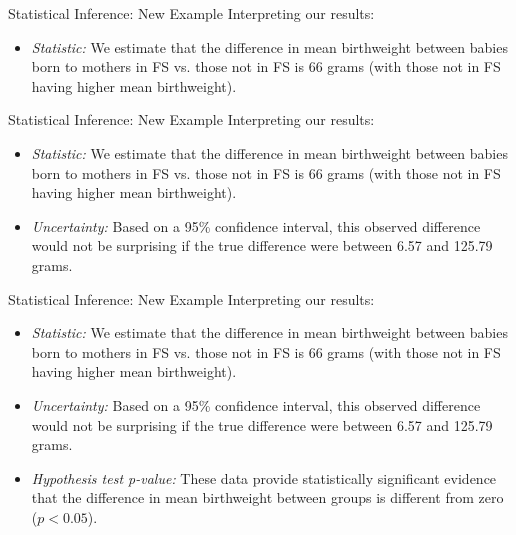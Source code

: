 \documentclass[10pt,t]{beamer}
\begin{document}
\begin{frame}{Statistical Inference: New Example}
Interpreting our results:

\vspace{0.3cm}

\begin{itemize}
	\item \textit{Statistic:} We estimate that the difference in mean birthweight between babies born to mothers in FS vs. those not in FS is 66 grams (with those not in FS having higher mean birthweight).
\end{itemize}

\end{frame}

\begin{frame}{Statistical Inference: New Example}
Interpreting our results:

\vspace{0.3cm}

\begin{itemize}
	\item \textit{Statistic:} We estimate that the difference in mean birthweight between babies born to mothers in FS vs. those not in FS is 66 grams (with those not in FS having higher mean birthweight).
	\item \textit{Uncertainty:} Based on a 95\% confidence interval, this observed difference would not be surprising if the true difference were between 6.57 and 125.79 grams.
\end{itemize}

\end{frame}

\begin{frame}{Statistical Inference: New Example}
Interpreting our results:

\vspace{0.3cm}

\begin{itemize}
	\item \textit{Statistic:} We estimate that the difference in mean birthweight between babies born to mothers in FS vs. those not in FS is 66 grams (with those not in FS having higher mean birthweight).
	\item \textit{Uncertainty:} Based on a 95\% confidence interval, this observed difference would not be surprising if the true difference were between 6.57 and 125.79 grams.
	\item \textit{Hypothesis test p-value:} These data provide statistically significant evidence that the difference in mean birthweight between groups is different from zero ($p < 0.05$).
\end{itemize}

\end{frame}
\end{document}
